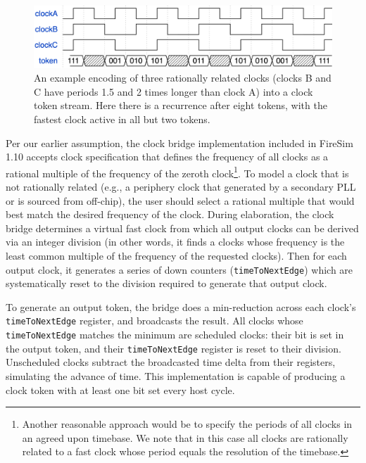 \begin{figure}
    \centering
    \includegraphics[width=\textwidth]{figures/clock-token.png}
    \caption{An example encoding of three rationally related clocks (clocks B and C have periods
    1.5 and 2 times longer than clock A) into a clock token stream. Here there is a recurrence
    after eight tokens, with the fastest clock active in all but two tokens.}
    \label{fig:clock-token}
\end{figure}

Per our earlier assumption, the clock bridge implementation included in FireSim 1.10 accepts clock specification that
defines the frequency of all clocks as a rational multiple of the
frequency of the zeroth clock\footnote{Another reasonable approach would be to
specify the periods of all clocks in an agreed upon timebase. We note
that in this case all clocks are rationally related to a fast clock whose
period equals the resolution of the timebase.}. To model a clock that is not
rationally related (e.g., a periphery clock that generated by a
secondary PLL or is sourced from off-chip), the user should select a rational
multiple that would best match the desired frequency of the clock.  During
elaboration, the clock bridge determines a virtual fast clock from which all
output clocks can be derived via an integer division (in other words, it finds
a clocks whose frequency is the least common multiple of the frequency of the
requested clocks). Then for each output clock, it generates a series of
down counters (\texttt{timeToNextEdge}) which are systematically reset to the
division required to generate that output clock.

To generate an output token, the bridge does a min-reduction across each clock's
\texttt{timeToNextEdge} register, and broadcasts the result. All clocks whose
\texttt{timeToNextEdge} matches the minimum are scheduled clocks: their bit is
set in the output token, and their \texttt{timeToNextEdge} register is reset to
their division. Unscheduled clocks subtract the broadcasted time delta from
their registers, simulating the advance of time.  This implementation is
capable of producing a clock token with at least one bit set every host cycle.

